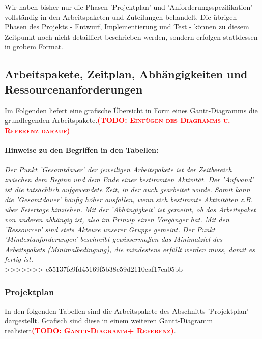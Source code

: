 \documentclass[fontsize=12pt,paper=a4,twoside]{scrartcl}
\newcommand{\todo}[1]{\textbf{\textsc{\textcolor{red}{(TODO: #1)}}}}
\begin{document}
Wir haben bisher nur die Phasen 'Projektplan' und 'Anforderungsspezifikation' vollständig in den Arbeitspaketen und Zuteilungen behandelt. Die übrigen Phasen des Projekts - Entwurf, Implementierung und Test - können zu diesem Zeitpunkt noch nicht detailliert beschrieben werden, sondern erfolgen stattdessen in grobem Format. \\

\subsection{Arbeitspakete, Zeitplan, Abhängigkeiten und Ressourcenanforderungen}\label{aps}

Im Folgenden liefert eine grafische Übersicht in Form eines Gantt-Diagramms die grundlegenden Arbeitspakete.\todo{Einfügen des Diagramms u. Referenz darauf}\\

\paragraph{Hinweise zu den Begriffen in den Tabellen:} \textit{Der Punkt 'Gesamtdauer' der jeweiligen Arbeitspakete ist der Zeitbereich zwischen dem Beginn und dem Ende einer bestimmten Aktivität. Der 'Aufwand' ist die tatsächlich aufgewendete Zeit, in der auch gearbeitet wurde. Somit kann die 'Gesamtdauer' häufig höher ausfallen, wenn sich bestimmte Aktivitäten z.B. über Feiertage hinziehen. Mit der 'Abhängigkeit' ist gemeint, ob das Arbeitspaket von anderen abhängig ist, also im Prinzip einen Vorgänger hat. Mit den 'Ressourcen' sind stets Akteure unserer Gruppe gemeint. Der Punkt 'Mindestanforderungen' beschreibt gewissermaßen das Minimalziel des Arbeitspakets (Minimalbedingung), die mindestens erfüllt werden muss, damit es fertig ist.}\\

>>>>>>> c55137fe9fd45169f5b38c59d2110caf17ca05bb
\subsubsection{Projektplan}\label{aps}

In den folgenden Tabellen sind die Arbeitspakete des Abschnitts 'Projektplan' dargestellt. Grafisch sind diese in einem weiteren Gantt-Diagramm realisiert\todo{Gantt-Diagramm+ Referenz}. \\
\end{document}
